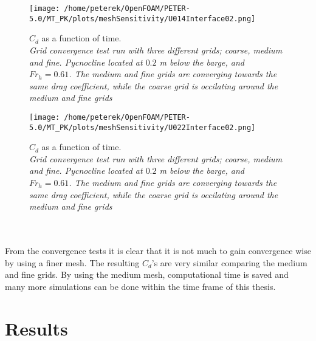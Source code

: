 \documentclass[a4paper, 12pt]{report}
\begin{document}
\begin{minipage}{.45\textwidth} 
	\begin{figure}[H]
		\centering
		\texttt{[image: /home/peterek/OpenFOAM/PETER-5.0/MT\_PK/plots/meshSensitivity/U014Interface02.png]}
		\caption{$C_d$ as a function of time. \\ \textit{Grid convergence test run with three different grids; coarse, medium and fine. Pycnocline located at $0.2$ m below the barge, and $Fr_h = 0.61$. The medium and fine grids are converging towards the same drag coefficient, while the coarse grid is occilating around the medium and fine grids}}
		\label{fig:convTestIf02U016}
	\end{figure}
\end{minipage}\hfill
\vspace{2ex}
\begin{minipage}{.45\textwidth} 
	\begin{figure}[H]
		\centering
		\texttt{[image: /home/peterek/OpenFOAM/PETER-5.0/MT\_PK/plots/meshSensitivity/U022Interface02.png]}
		\caption{$C_d$ as a function of time. \\ \textit{Grid convergence test run with three different grids; coarse, medium and fine. Pycnocline located at $0.2$ m below the barge, and $Fr_h = 0.61$. The medium and fine grids are converging towards the same drag coefficient, while the coarse grid is occilating around the medium and fine grids}}
		\label{fig:convTestIf02U022}
	\end{figure}
\end{minipage}\hfill
\vspace{2ex}
\\
\\
From the convergence tests it is clear that it is not much to gain convergence wise by using a finer mesh. The resulting $C_d$'s are very similar comparing the medium and fine grids. By using the medium mesh, computational time is saved and many more simulations  can be done within the time frame of this thesis.   

\chapter{Results}
\end{document}
